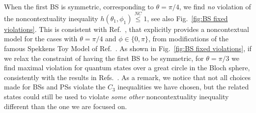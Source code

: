 \documentclass[letterpaper,onecolumn,12pt,accepted=2024-01-17]{article}
\begin{document}
When the first BS is symmetric, corresponding to $\theta=\pi/4$, we find \textit{no} violation of the noncontextuality inequality $h(\theta_1,\phi_1) \stackrel{NC}{\leq} 1$, see also Fig.~\ref{fig:BS fixed violations}. This is consistent with Ref.~\cite{catani2021interference}, that explicitly provides a noncontextual model for the cases with $\theta = \pi/4$ and $\phi \in \{0,\pi\}$, from modifications of the famous Spekkens Toy Model of Ref.~\cite{spekkens2007evidence}. As shown in Fig.~\ref{fig:BS fixed violations}, if we relax the constraint of having the first BS to be symmetric, for $\theta=\pi/3$ we find maximal violation for quantum states over a great circle in the Bloch sphere, consistently with the results in Refs.~\cite{galvaobroad2020quantumandclassical,giordani2021witnessesofcoherence}. As a remark, we notice that not all choices made for BSs and PSs violate the $C_3$ inequalities we have chosen, but the related states could still be used to violate \textit{some other} noncontextuality inequality different than the one we are focused {on.} 
\end{document}

